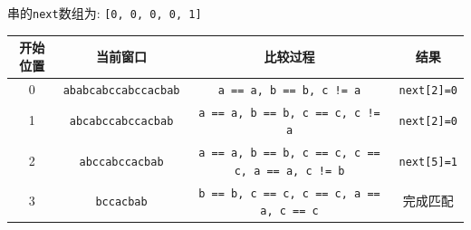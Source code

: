 \documentclass[../../main.tex]{subfiles}
\begin{document}
\begin{solution}
\begin{enumerate}
              串的\texttt{next}数组为: \texttt{[0, 0, 0, 0, 1]}
              \begin{longtable}{|c|c|c|c|}
                  \hline
                  \textbf{开始位置} & \textbf{当前窗口}               & \textbf{比较过程}                                           & \textbf{结果}        \\
                  \hline
                  0             & \texttt{ababcabccabccacbab} & \texttt{a == a, b == b, c != a}                         & \texttt{next[2]=0} \\
                  \hline
                  1             & \texttt{abcabccabccacbab}   & \texttt{a == a, b == b, c == c, c != a}                 & \texttt{next[2]=0} \\
                  \hline
                  2             & \texttt{abccabccacbab}      & \texttt{a == a, b == b, c == c, c == c, a == a, c != b} & \texttt{next[5]=1} \\
                  \hline
                  3             & \texttt{bccacbab}           & \texttt{b == b, c == c, c == c, a == a, c == c}         & 完成匹配               \\
                  \hline
              \end{longtable}
    \end{enumerate}
\end{solution}
\end{document}
